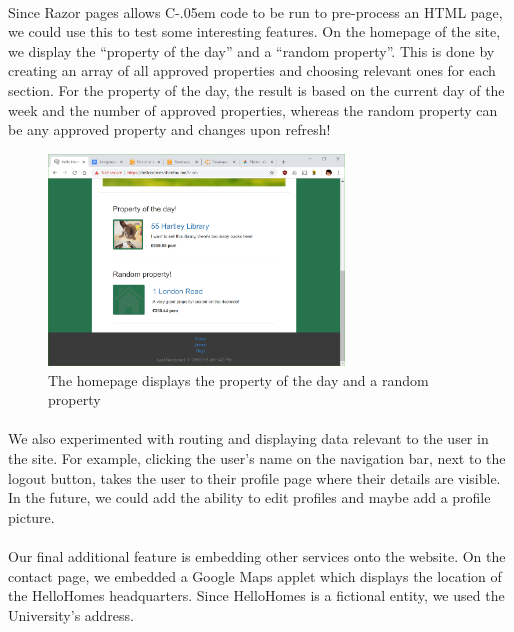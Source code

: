 \documentclass{article}
\newcommand{\Csharp}{%
  {\settoheight{\dimen0}{C}C\kern-.05em \resizebox{!}{\dimen0}{\raisebox{\depth}{\#}}}}
\begin{document}
        \paragraph{}
            Since Razor pages allows \Csharp\space code to be run to pre-process an HTML page, we could use this to test some interesting features.
            On the homepage of the site, we display the “property of the day” and a “random property”.
            This is done by creating an array of all approved properties and choosing relevant ones for each section.
            For the property of the day, the result is based on the current day of the week and the number of approved properties, whereas the random property can be any approved property and changes upon refresh!

            \begin{figure}[!htb]
                \centering
                \includegraphics[width=0.7\textwidth]{figures/property_of_the_day.png}
                \caption[Property Of The Day]{The homepage displays the property of the day and a random property}
            \end{figure}

        \paragraph{}
            We also experimented with routing and displaying data relevant to the user in the site.
            For example, clicking the user’s name on the navigation bar, next to the logout button, takes the user to their profile page where their details are visible.
            In the future, we could add the ability to edit profiles and maybe add a profile picture.

        \paragraph{}
            Our final additional feature is embedding other services onto the website.
            On the contact page, we embedded a Google Maps applet which displays the location of the HelloHomes headquarters.
            Since HelloHomes is a fictional entity, we used the University's address.
\end{document}
